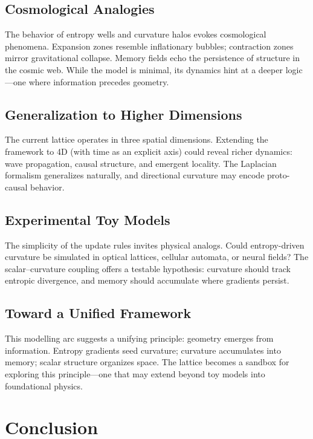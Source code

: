 \documentclass[12pt]{article}
\begin{document}
\subsection{Cosmological Analogies}

The behavior of entropy wells and curvature halos evokes cosmological phenomena. Expansion zones resemble inflationary bubbles; contraction zones mirror gravitational collapse. Memory fields echo the persistence of structure in the cosmic web. While the model is minimal, its dynamics hint at a deeper logic—one where information precedes geometry.

\subsection{Generalization to Higher Dimensions}

The current lattice operates in three spatial dimensions. Extending the framework to 4D (with time as an explicit axis) could reveal richer dynamics: wave propagation, causal structure, and emergent locality. The Laplacian formalism generalizes naturally, and directional curvature may encode proto-causal behavior.

\subsection{Experimental Toy Models}

The simplicity of the update rules invites physical analogs. Could entropy-driven curvature be simulated in optical lattices, cellular automata, or neural fields? The scalar–curvature coupling offers a testable hypothesis: curvature should track entropic divergence, and memory should accumulate where gradients persist.

\subsection{Toward a Unified Framework}

This modelling arc suggests a unifying principle: geometry emerges from information. Entropy gradients seed curvature; curvature accumulates into memory; scalar structure organizes space. The lattice becomes a sandbox for exploring this principle—one that may extend beyond toy models into foundational physics.


\section{Conclusion}
\end{document}
